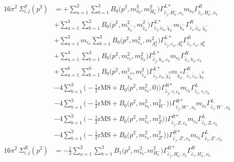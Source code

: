 \begin{itemize}
\begin{align} 
16\pi^2 \ \Sigma^S_{i,j}(p^2) &= +\sum_{a=1}^{2}\sum_{b=1}^{3}{B_0\Big(p^{2},m^2_{\nu_{{b}}},m^2_{H^-_{{a}}}\Big)} {\Gamma^{L*}_{\check{\bar{e}}_{{j}},H^-_{{a}},\nu_{{b}}}} m_{\nu_{{b}}} {\Gamma^R_{\check{\bar{e}}_{{i}},H^-_{{a}},\nu_{{b}}}} \nonumber \\ 
 &+\sum_{a=1}^{3}\sum_{b=1}^{2}{B_0\Big(p^{2},m^2_{\tilde{\chi}^-_{{b}}},m^2_{\tilde{\nu}_{{a}}}\Big)} {\Gamma^{L*}_{\check{\bar{e}}_{{j}},\tilde{\nu}_{{a}},\tilde{\chi}^-_{{b}}}} m_{\tilde{\chi}^-_{{b}}} {\Gamma^R_{\check{\bar{e}}_{{i}},\tilde{\nu}_{{a}},\tilde{\chi}^-_{{b}}}} \nonumber \\ 
 &+\sum_{a=1}^{3}m_{e_{{a}}} \sum_{b=1}^{3}{B_0\Big(p^{2},m^2_{e_{{a}}},m^2_{A^0_{{b}}}\Big)} {\Gamma^{L*}_{\check{\bar{e}}_{{j}},e_{{a}},A^0_{{b}}}} {\Gamma^R_{\check{\bar{e}}_{{i}},e_{{a}},A^0_{{b}}}}  \nonumber \\ 
 &+\sum_{a=1}^{3}\sum_{b=1}^{3}{B_0\Big(p^{2},m^2_{e_{{b}}},m^2_{h_{{a}}}\Big)} {\Gamma^{L*}_{\check{\bar{e}}_{{j}},h_{{a}},e_{{b}}}} m_{e_{{b}}} {\Gamma^R_{\check{\bar{e}}_{{i}},h_{{a}},e_{{b}}}} \nonumber \\ 
 &+\sum_{a=1}^{6}\sum_{b=1}^{6}{B_0\Big(p^{2},m^2_{\tilde{\chi}^0_{{b}}},m^2_{\tilde{e}_{{a}}}\Big)} {\Gamma^{L*}_{\check{\bar{e}}_{{j}},\tilde{e}_{{a}},\tilde{\chi}^0_{{b}}}} m_{\tilde{\chi}^0_{{b}}} {\Gamma^R_{\check{\bar{e}}_{{i}},\tilde{e}_{{a}},\tilde{\chi}^0_{{b}}}} \nonumber \\ 
 &-4 \sum_{b=1}^{3}\Big(-\frac{1}{2} \text{rMS}  + {B_0\Big(p^{2},m^2_{e_{{b}}},0\Big)}\Big){\Gamma^{R*}_{\check{\bar{e}}_{{j}},\gamma,e_{{b}}}} m_{e_{{b}}} {\Gamma^L_{\check{\bar{e}}_{{i}},\gamma,e_{{b}}}}  \nonumber \\ 
 &-4 \sum_{b=1}^{3}\Big(-\frac{1}{2} \text{rMS}  + {B_0\Big(p^{2},m^2_{\nu_{{b}}},m^2_{W^-}\Big)}\Big){\Gamma^{R*}_{\check{\bar{e}}_{{j}},W^-,\nu_{{b}}}} m_{\nu_{{b}}} {\Gamma^L_{\check{\bar{e}}_{{i}},W^-,\nu_{{b}}}}  \nonumber \\ 
 &-4 \sum_{b=1}^{3}\Big(-\frac{1}{2} \text{rMS}  + {B_0\Big(p^{2},m^2_{e_{{b}}},m^2_{Z}\Big)}\Big){\Gamma^{R*}_{\check{\bar{e}}_{{j}},Z,e_{{b}}}} m_{e_{{b}}} {\Gamma^L_{\check{\bar{e}}_{{i}},Z,e_{{b}}}}  \nonumber \\ 
 &-4 \sum_{b=1}^{3}\Big(-\frac{1}{2} \text{rMS}  + {B_0\Big(p^{2},m^2_{e_{{b}}},m^2_{{Z'}}\Big)}\Big){\Gamma^{R*}_{\check{\bar{e}}_{{j}},{Z'},e_{{b}}}} m_{e_{{b}}} {\Gamma^L_{\check{\bar{e}}_{{i}},{Z'},e_{{b}}}}  \\ 
16\pi^2 \ \Sigma^R_{i,j}(p^2) &= -\frac{1}{2} \sum_{a=1}^{2}\sum_{b=1}^{3}{B_1\Big(p^{2},m^2_{\nu_{{b}}},m^2_{H^-_{{a}}}\Big)} {\Gamma^{R*}_{\check{\bar{e}}_{{j}},H^-_{{a}},\nu_{{b}}}} {\Gamma^R_{\check{\bar{e}}_{{i}},H^-_{{a}},\nu_{{b}}}}  \nonumber \\ 

\end{align}
\end{itemize}
